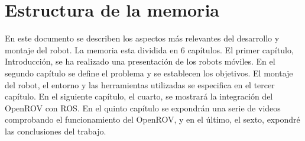 \section{Estructura de la memoria}
\label{cap:estructuradelamemoria}
En este documento se describen los aspectos más relevantes del desarrollo y montaje del robot. La memoria esta dividida en 6 capítulos. 
El primer capítulo, Introducción, se ha realizado una presentación de los robots móviles. En el segundo capítulo se define el problema y se establecen los objetivos. El montaje del robot, el entorno y las herramientas utilizadas se especifica en el tercer capítulo. En el siguiente capítulo, el cuarto, se mostrará la integración del OpenROV con ROS. En el quinto capítulo se expondrán una serie de videos comprobando el funcionamiento del OpenROV, y en el último, el sexto, expondré las conclusiones del trabajo.
